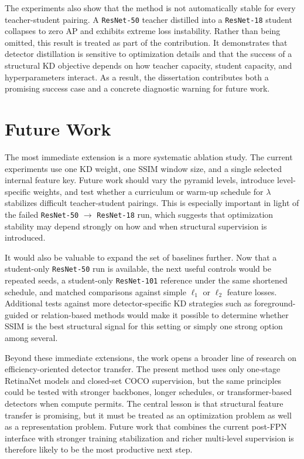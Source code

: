 The experiments also show that the method is not automatically stable for every teacher-student pairing. A \texttt{ResNet-50} teacher distilled into a \texttt{ResNet-18} student collapses to zero AP and exhibits extreme loss instability. Rather than being omitted, this result is treated as part of the contribution. It demonstrates that detector distillation is sensitive to optimization details and that the success of a structural KD objective depends on how teacher capacity, student capacity, and hyperparameters interact. As a result, the dissertation contributes both a promising success case and a concrete diagnostic warning for future work.

\section{Future Work}

The most immediate extension is a more systematic ablation study. The current experiments use one KD weight, one SSIM window size, and a single selected internal feature key. Future work should vary the pyramid levels, introduce level-specific weights, and test whether a curriculum or warm-up schedule for $\lambda$ stabilizes difficult teacher-student pairings. This is especially important in light of the failed \texttt{ResNet-50} $\rightarrow$ \texttt{ResNet-18} run, which suggests that optimization stability may depend strongly on how and when structural supervision is introduced.

It would also be valuable to expand the set of baselines further. Now that a student-only \texttt{ResNet-50} run is available, the next useful controls would be repeated seeds, a student-only \texttt{ResNet-101} reference under the same shortened schedule, and matched comparisons against simple $\ell_1$ or $\ell_2$ feature losses. Additional tests against more detector-specific KD strategies such as foreground-guided or relation-based methods would make it possible to determine whether SSIM is the best structural signal for this setting or simply one strong option among several.

Beyond these immediate extensions, the work opens a broader line of research on efficiency-oriented detector transfer. The present method uses only one-stage RetinaNet models and closed-set COCO supervision, but the same principles could be tested with stronger backbones, longer schedules, or transformer-based detectors when compute permits. The central lesson is that structural feature transfer is promising, but it must be treated as an optimization problem as well as a representation problem. Future work that combines the current post-FPN interface with stronger training stabilization and richer multi-level supervision is therefore likely to be the most productive next step.

